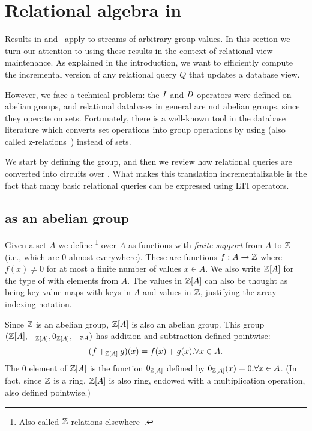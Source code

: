 \section{Relational algebra in \dbsp}\label{sec:relational}

Results in  and~
apply to streams of arbitrary group values.  In this
section we turn our attention to using these results in the context of 
relational view maintenance.  As explained in the introduction, we want to
efficiently compute the incremental version of any relational query $Q$
that updates a database view.

However, we face a technical problem: the $\mathit{I}$ and $\mathit{D}$ operators were
defined on abelian groups, and relational databases in general are 
not abelian groups, since they operate on sets.  Fortunately, 
there is a well-known tool in the database literature
which converts set operations into group operations by using \zrs
(also called z-relations~\cite{green-pods07}) instead of sets.

We start by defining the \zrs group, and then we review how 
relational queries are converted into \dbsp circuits  over \zrs.  
What makes this translation incrementalizable is the fact that
many basic relational queries can be expressed using LTI \zr operators.

\subsection{\zrs as an abelian group}

Given a set $A$ we define \footnote{Also called $\mathbb{Z}$-relations elsewhere~\cite{green-tcs11}.}
over $A$ as functions with \emph{finite support} from $A$ to $\mathbb{Z}$ (i.e., which are 0 almost everywhere).  
These are functions $f: A \rightarrow \mathbb{Z}$ where 
$f(x) \not= 0$ for at most a finite number of values $x \in A$.
We also write $\mathbb{Z}[A]$ for the type of \zrs with elements from $A$.
The values in $\mathbb{Z}[A]$ can also be thought as being key-value maps with 
keys in $A$ and values in $\mathbb{Z}$, justifying the array indexing notation.

Since $\mathbb{Z}$ is an abelian group, $\mathbb{Z}[A]$ is also an abelian group.  This group
$(\mathbb{Z}[A], +_{\mathbb{Z}[A]}, 0_{\mathbb{Z}[A]}, -_{\mathbb{Z}{A}})$ has addition and subtraction defined pointwise: 
$$(f +_{\mathbb{Z}[A]} g)(x) = f(x) + g(x) . \forall x \in A.$$  
The $0$ element of $\mathbb{Z}[A]$ is the function $0_{\mathbb{Z}[A]}$ defined by $0_{\mathbb{Z}[A]}(x) = 0 . \forall x \in A$. 
(In fact, since $\mathbb{Z}$ is a ring, $\mathbb{Z}[A]$ is also ring, endowed with a multiplication operation,
also defined pointwise.)

